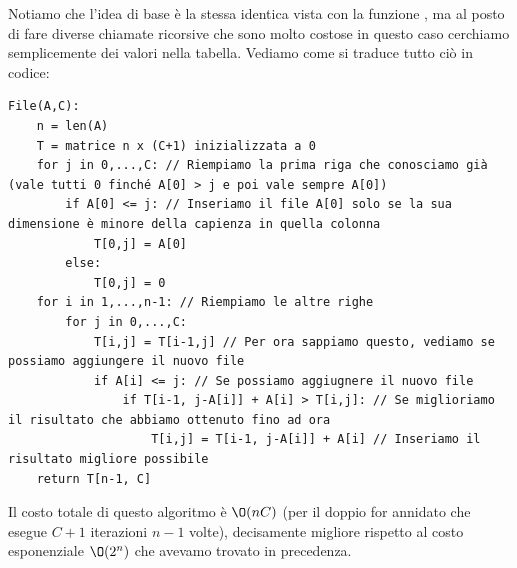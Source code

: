 \documentclass[11pt, a4paper, titlepage, oneside]{scrbook}
\begin{document}
Notiamo che l'idea di base è la stessa identica vista con la funzione , ma al posto di fare diverse chiamate ricorsive che sono molto costose in questo caso cerchiamo semplicemente dei valori nella tabella. Vediamo come si traduce tutto ciò in codice:

\begin{lstlisting}
File(A,C):
    n = len(A)
    T = matrice n x (C+1) inizializzata a 0
    for j in 0,...,C: // Riempiamo la prima riga che conosciamo già (vale tutti 0 finché A[0] > j e poi vale sempre A[0])
        if A[0] <= j: // Inseriamo il file A[0] solo se la sua dimensione è minore della capienza in quella colonna 
            T[0,j] = A[0]
        else:
            T[0,j] = 0
    for i in 1,...,n-1: // Riempiamo le altre righe
        for j in 0,...,C:
            T[i,j] = T[i-1,j] // Per ora sappiamo questo, vediamo se possiamo aggiungere il nuovo file
            if A[i] <= j: // Se possiamo aggiugnere il nuovo file
                if T[i-1, j-A[i]] + A[i] > T[i,j]: // Se miglioriamo il risultato che abbiamo ottenuto fino ad ora
                    T[i,j] = T[i-1, j-A[i]] + A[i] // Inseriamo il risultato migliore possibile
    return T[n-1, C]
\end{lstlisting}

Il costo totale di questo algoritmo è $\O(nC)$ (per il doppio for annidato che esegue $C+1$ iterazioni $n-1$ volte), decisamente migliore rispetto al costo esponenziale $\O(2^n)$ che avevamo trovato in precedenza.
\end{document}
